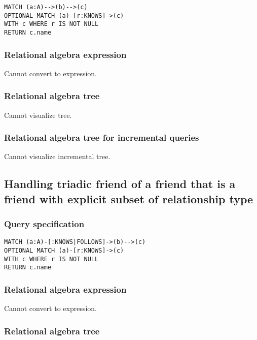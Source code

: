 \begin{lstlisting}
MATCH (a:A)-->(b)-->(c)
OPTIONAL MATCH (a)-[r:KNOWS]->(c)
WITH c WHERE r IS NOT NULL
RETURN c.name
\end{lstlisting}

\subsubsection*{Relational algebra expression}

Cannot convert to expression.

\subsubsection*{Relational algebra tree}

Cannot visualize tree.

\subsubsection*{Relational algebra tree for incremental queries}

Cannot visualize incremental tree.

\subsection{Handling triadic friend of a friend that is a friend with explicit subset of relationship type}

\subsubsection*{Query specification}

\begin{lstlisting}
MATCH (a:A)-[:KNOWS|FOLLOWS]->(b)-->(c)
OPTIONAL MATCH (a)-[r:KNOWS]->(c)
WITH c WHERE r IS NOT NULL
RETURN c.name
\end{lstlisting}

\subsubsection*{Relational algebra expression}

Cannot convert to expression.

\subsubsection*{Relational algebra tree}

